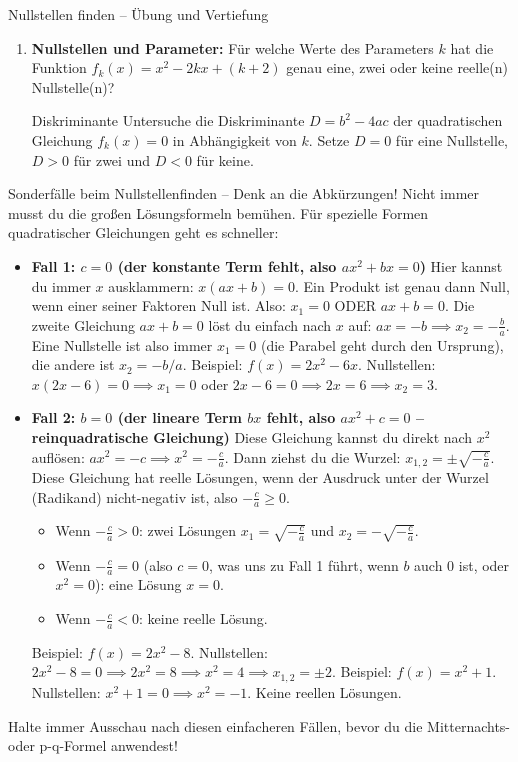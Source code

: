 \begin{aufgabenumgebung}{Nullstellen finden – Übung und Vertiefung}
\begin{enumerate}
    \item \textbf{Nullstellen und Parameter:}
        Für welche Werte des Parameters $k$ hat die Funktion $f_k(x) = x^2 - 2kx + (k+2)$ genau eine, zwei oder keine reelle(n) Nullstelle(n)?
        \begin{tippumgebung}{Diskriminante}
        Untersuche die Diskriminante $D = b^2-4ac$ der quadratischen Gleichung $f_k(x)=0$ in Abhängigkeit von $k$.
        Setze $D=0$ für eine Nullstelle, $D>0$ für zwei und $D<0$ für keine.
        \end{tippumgebung}

\end{enumerate}
\end{aufgabenumgebung}

\begin{infoboxumgebung}{Sonderfälle beim Nullstellenfinden – Denk an die Abkürzungen!}
Nicht immer musst du die großen Lösungsformeln bemühen. Für spezielle Formen quadratischer Gleichungen geht es schneller:

\begin{itemize}
    \item \textbf{Fall 1: $c=0$ (der konstante Term fehlt, also $ax^2 + bx = 0$)}
    Hier kannst du immer $x$ ausklammern: $x(ax+b)=0$.
    Ein Produkt ist genau dann Null, wenn einer seiner Faktoren Null ist. Also:
    $x_1 = 0$ \quad ODER \quad $ax+b=0$.
    Die zweite Gleichung $ax+b=0$ löst du einfach nach $x$ auf: $ax = -b \implies x_2 = -\frac{b}{a}$.
    Eine Nullstelle ist also immer $x_1=0$ (die Parabel geht durch den Ursprung), die andere ist $x_2 = -b/a$.
    Beispiel: $f(x) = 2x^2 - 6x$. Nullstellen: $x(2x-6)=0 \implies x_1=0$ oder $2x-6=0 \implies 2x=6 \implies x_2=3$.

    \item \textbf{Fall 2: $b=0$ (der lineare Term $bx$ fehlt, also $ax^2 + c = 0$ – reinquadratische Gleichung)}
    Diese Gleichung kannst du direkt nach $x^2$ auflösen:
    $ax^2 = -c \implies x^2 = -\frac{c}{a}$.
    Dann ziehst du die Wurzel: $x_{1,2} = \pm \sqrt{-\frac{c}{a}}$.
    Diese Gleichung hat reelle Lösungen, wenn der Ausdruck unter der Wurzel (Radikand) nicht-negativ ist, also $-\frac{c}{a} \ge 0$.
    \begin{itemize}
        \item Wenn $-\frac{c}{a} > 0$: zwei Lösungen $x_1 = \sqrt{-\frac{c}{a}}$ und $x_2 = -\sqrt{-\frac{c}{a}}$.
        \item Wenn $-\frac{c}{a} = 0$ (also $c=0$, was uns zu Fall 1 führt, wenn $b$ auch 0 ist, oder $x^2=0$): eine Lösung $x=0$.
        \item Wenn $-\frac{c}{a} < 0$: keine reelle Lösung.
    \end{itemize}
    Beispiel: $f(x) = 2x^2 - 8$. Nullstellen: $2x^2 - 8 = 0 \implies 2x^2 = 8 \implies x^2 = 4 \implies x_{1,2} = \pm 2$.
    Beispiel: $f(x) = x^2 + 1$. Nullstellen: $x^2 + 1 = 0 \implies x^2 = -1$. Keine reellen Lösungen.
\end{itemize}
Halte immer Ausschau nach diesen einfacheren Fällen, bevor du die Mitternachts- oder p-q-Formel anwendest!
\end{infoboxumgebung}

